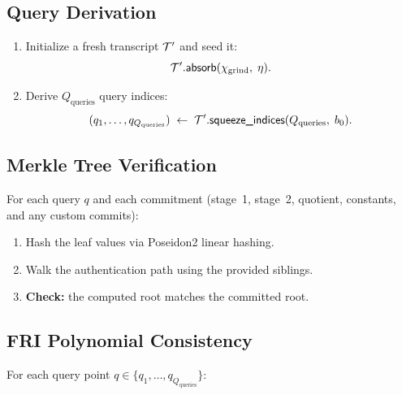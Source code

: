 \subsection{Query Derivation}
\label{sec:queries}

\begin{enumerate}[label=(\roman*)]
  \item Initialize a fresh transcript $\mathcal{T}'$ and seed it:
        \[
          \mathcal{T}'.\textsf{absorb}(\chi_{\mathrm{grind}},\; \eta).
        \]

  \item Derive $Q_{\mathrm{queries}}$ query indices:
        \[
          (q_1, \ldots, q_{Q_{\mathrm{queries}}})
          \;\leftarrow\; \mathcal{T}'.\textsf{squeeze\_indices}(Q_{\mathrm{queries}},\; b_0).
        \]
\end{enumerate}

\subsection{Merkle Tree Verification}
\label{sec:merkle-check}

For each query $q$ and each commitment
(stage~1, stage~2, quotient, constants, and any custom commits):

\begin{enumerate}[label=(\roman*)]
  \item Hash the leaf values via Poseidon2 linear hashing.
  \item Walk the authentication path using the provided siblings.
  \item \textbf{Check:} the computed root matches the committed root.
\end{enumerate}

\subsection{FRI Polynomial Consistency}
\label{sec:fri-consistency}

For each query point $q \in \{q_1, \ldots, q_{Q_{\mathrm{queries}}}\}$:

